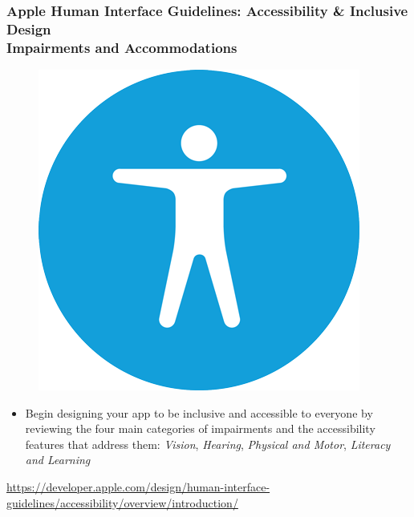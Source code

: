 \documentclass[screen, aspectratio=169]{beamer}
\begin{document}
\begin{frame}
\frametitle{Apple Human Interface Guidelines: Accessibility \& Inclusive Design\\Impairments and Accommodations}
 \begin{figure}
	\includegraphics[scale=0.18]{img/apple-accessibility-icon_2x.png}
    \end{figure}
\begin{itemize}
\item Begin designing your app to be inclusive and accessible to everyone by reviewing the four main categories of impairments and the accessibility features that address them: \emph{Vision}, \emph{Hearing}, \emph{Physical and Motor}, \emph{Literacy and Learning}
\end{itemize} 
{\scriptsize \url{https://developer.apple.com/design/human-interface-guidelines/accessibility/overview/introduction/}    }
\end{frame}
%
\end{document}
